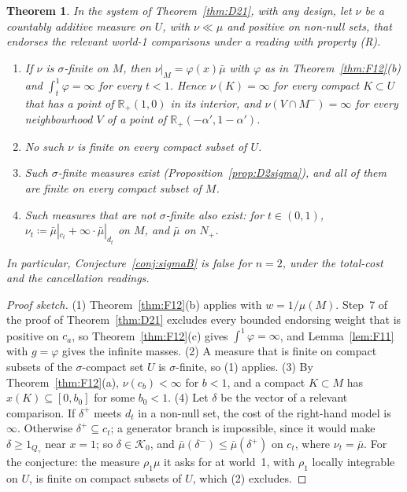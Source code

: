 \documentclass[11pt]{article}
\newtheorem{theorem}{Theorem}[section]
\theoremstyle{definition}
\theoremstyle{remark}
\newcommand{\R}{\mathbb R}
\begin{document}
\begin{theorem}\label{thm:F13}
In the system of Theorem~\ref{thm:D21}, with any design, let $\nu$ be a countably additive measure on $U$, with $\nu\ll\mu$ and positive on non-null sets, that endorses the relevant world-1 comparisons under a reading with property (R).
\begin{enumerate}[leftmargin=*,label=(\arabic*)]
\item If $\nu$ is $\sigma$-finite on $M$, then $\nu|_M=\varphi(x)\bar\mu$ with $\varphi$ as in Theorem~\ref{thm:F12}(b) and $\int_t^1\varphi=\infty$ for every $t<1$. Hence $\nu(K)=\infty$ for every compact $K\subset U$ that has a point of $\R_+(1,0)$ in its interior, and $\nu(V\cap M^-)=\infty$ for every neighbourhood $V$ of a point of $\R_+(-\alpha',1-\alpha')$.
\item No such $\nu$ is finite on every compact subset of $U$.
\item Such $\sigma$-finite measures exist (Proposition~\ref{prop:D2sigma}), and all of them are finite on every compact subset of $M$.
\item Such measures that are not $\sigma$-finite also exist: for $t\in(0,1)$, $\nu_t\coloneqq\bar\mu|_{c_t}+\infty\cdot\bar\mu|_{d_t}$ on $M$, and $\bar\mu$ on $N_+$.
\end{enumerate}
In particular, Conjecture~\ref{conj:sigmaB} is false for $n=2$, under the total-cost and the cancellation readings.
\end{theorem}
\begin{proof}[Proof sketch]
(1) Theorem~\ref{thm:F12}(b) applies with $w=1/\mu(M)$. Step~7 of the proof of Theorem~\ref{thm:D21} excludes every bounded endorsing weight that is positive on $c_a$, so Theorem~\ref{thm:F12}(c) gives $\int^1\varphi=\infty$, and Lemma~\ref{lem:F11} with $g=\varphi$ gives the infinite masses. (2) A measure that is finite on compact subsets of the $\sigma$-compact set $U$ is $\sigma$-finite, so (1) applies. (3) By Theorem~\ref{thm:F12}(a), $\nu(c_b)<\infty$ for $b<1$, and a compact $K\subset M$ has $x(K)\subseteq[0,b_0]$ for some $b_0<1$. (4) Let $\delta$ be the vector of a relevant comparison. If $\delta^+$ meets $d_t$ in a non-null set, the cost of the right-hand model is $\infty$. Otherwise $\delta^+\subseteq c_t$; a generator branch is impossible, since it would make $\delta\ge1_{Q_\gamma}$ near $x=1$; so $\delta\in\mathcal K_0$, and $\bar\mu(\delta^-)\le\bar\mu(\delta^+)$ on $c_t$, where $\nu_t=\bar\mu$. For the conjecture: the measure $\rho_1\mu$ it asks for at world~1, with $\rho_1$ locally integrable on $U$, is finite on compact subsets of $U$, which (2) excludes.
\end{proof}
\end{document}
